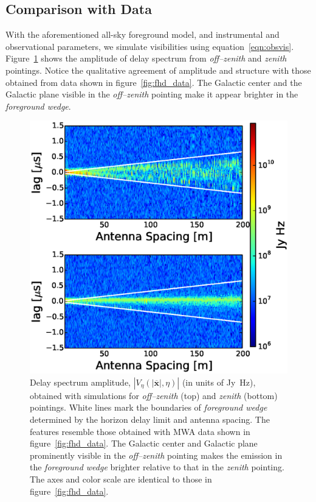 \documentclass[preprint2,iop,numberedappendix]{emulateapj}
\begin{document}
\subsection{Comparison with Data}\label{sec:data-vs-model}

With the aforementioned all-sky foreground model, and instrumental and observational parameters, we simulate visibilities using equation~\ref{eqn:obsvis}. Figure~\ref{fig:sim_data} shows the amplitude of delay spectrum from {\it off--zenith} and {\it zenith} pointings. Notice the qualitative agreement of amplitude and structure with those obtained from data shown in figure~\ref{fig:fhd_data}. The Galactic center and the Galactic plane visible in the {\it off--zenith} pointing make it appear brighter in the {\it foreground wedge}. 

\begin{figure}[htb]
\centering
\includegraphics[width=\linewidth]{figures/v1_0/multi_baseline_sim_delay_spectrum_snapshots.eps}
\caption{Delay spectrum amplitude, $|V_\eta(|\overline{\mathbf{x}}|,\eta)|$ (in units of Jy~Hz), obtained with simulations for {\it off--zenith} (top) and {\it zenith} (bottom) pointings. White lines mark the boundaries of {\it foreground wedge} determined by the horizon delay limit and antenna spacing. The features resemble those obtained with MWA data shown in figure~\ref{fig:fhd_data}. The Galactic center and Galactic plane prominently visible in the {\it off--zenith} pointing makes the emission in the {\it foreground wedge} brighter relative to that in the {\it zenith} pointing. The axes and color scale are identical to those in figure~\ref{fig:fhd_data}. \label{fig:sim_data}}
\end{figure}
\end{document}

